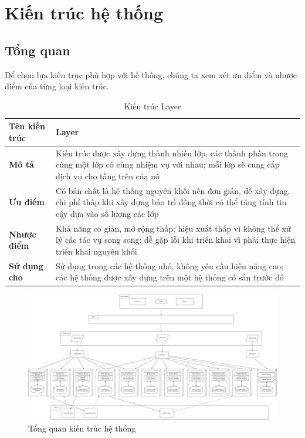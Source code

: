
\section{Kiến trúc hệ thống}
\subsection{Tổng quan}

Để chọn lựa kiến trục phù hợp với hế thống, chúng ta xem xét ưu điểm và nhược điểm của từng loại kiến trúc.\\

\begin{table}
	\begin{tabular}{|p{3cm}|p{12cm}|}
		\hline
		\textbf{Tên kiến trúc} & Layer\\
		\hline
		\textbf{Mô tả}         & Kiến trúc được xây dựng thành nhiều lớp, các thành phần trong cùng một lớp có cùng nhiệm vụ với nhau; mỗi lớp sẽ cung cấp dịch vụ cho tầng trên của nó       \\
		\hline
		\textbf{Ưu điểm}       & Có bản chất là hệ thống nguyên khối nên đơn giản, dễ xây dựng, chi phí thấp khi xây dựng bảo trì đồng thời có thể tăng tính tin cậy dựa vào số lượng các lớp \\
		\hline
		\textbf{Nhược điểm}    & Khả năng co giản, mở rộng thấp; hiệu xuất thấp vì không thể xử lý các tác vụ song song; dễ gặp lỗi khi triển khai vì phải thực hiện triển khai nguyên khối   \\
		\hline
		\textbf{Sử dụng cho}   & Sử dụng trong các hệ thống nhỏ, không yêu cầu hiệu năng cao; các hệ thống được xây dựng trên một hệ thống có sẵn trước đó                                    \\
		\hline
	\end{tabular}
	\caption{Kiến trúc Layer}
\end{table}


\begin{figure}[!htp]
	\centering
	\includegraphics[width=6in]{img/Architecture/general-architect.png}
	\newline
	\caption{Tổng quan kiến trúc hệ thống}
\end{figure}

